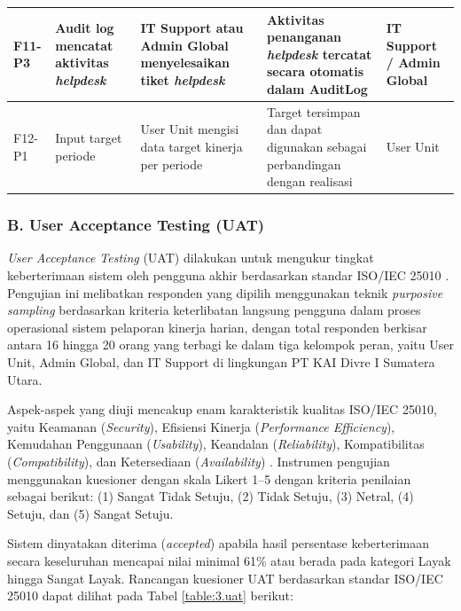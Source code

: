 \begin{longtable}{|p{}|p{}|p{}|p{}|p{}|}
    \hline
    F11-P3 & Audit log mencatat aktivitas \textit{helpdesk} & IT Support atau Admin Global menyelesaikan tiket \textit{helpdesk} & Aktivitas penanganan \textit{helpdesk} tercatat secara otomatis dalam AuditLog & IT Support / Admin Global \\
    \hline
    F12-P1 & Input target periode & User Unit mengisi data target kinerja per periode & Target tersimpan dan dapat digunakan sebagai perbandingan dengan realisasi & User Unit \\
    \hline
\end{longtable}

\subsubsection*{B. User Acceptance Testing (UAT)}
\textit{User Acceptance Testing} (UAT) dilakukan untuk mengukur tingkat keberterimaan sistem oleh pengguna akhir berdasarkan standar ISO/IEC 25010 \cite{lamada2024iso}. Pengujian ini melibatkan responden yang dipilih menggunakan teknik \textit{purposive sampling} \cite{sugiyono2019} berdasarkan kriteria keterlibatan langsung pengguna dalam proses operasional sistem pelaporan kinerja harian, dengan total responden berkisar antara 16 hingga 20 orang yang terbagi ke dalam tiga kelompok peran, yaitu User Unit, Admin Global, dan IT Support di lingkungan PT KAI Divre I Sumatera Utara. \par

Aspek-aspek yang diuji mencakup enam karakteristik kualitas ISO/IEC 25010, yaitu Keamanan (\textit{Security}), Efisiensi Kinerja (\textit{Performance Efficiency}), Kemudahan Penggunaan (\textit{Usability}), Keandalan (\textit{Reliability}), Kompatibilitas (\textit{Compatibility}), dan Ketersediaan (\textit{Availability}) \cite{lamada2024iso}. Instrumen pengujian menggunakan kuesioner dengan skala Likert 1--5 dengan kriteria penilaian sebagai berikut: (1) Sangat Tidak Setuju, (2) Tidak Setuju, (3) Netral, (4) Setuju, dan (5) Sangat Setuju. \par

Sistem dinyatakan diterima (\textit{accepted}) apabila hasil persentase keberterimaan secara keseluruhan mencapai nilai minimal 61\% atau berada pada kategori Layak hingga Sangat Layak. Rancangan kuesioner UAT berdasarkan standar ISO/IEC 25010 dapat dilihat pada Tabel \ref{table:3.uat} berikut: \par

